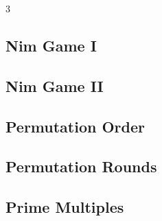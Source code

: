 \documentclass[8pt]{extarticle}
\begin{document}
\begin{multicols*}{3}
\subsection{Nim Game I}
\begin{caixaenunciado}

\end{caixaenunciado}
\vspace{0.3cm}


\subsection{Nim Game II}
\begin{caixaenunciado}

\end{caixaenunciado}
\vspace{0.3cm}


\subsection{Permutation Order}
\begin{caixaenunciado}

\end{caixaenunciado}
\vspace{0.3cm}


\subsection{Permutation Rounds}
\begin{caixaenunciado}

\end{caixaenunciado}
\vspace{0.3cm}


\subsection{Prime Multiples}
\begin{caixaenunciado}

\end{caixaenunciado}
\vspace{0.3cm}



\end{multicols*}
\end{document}
